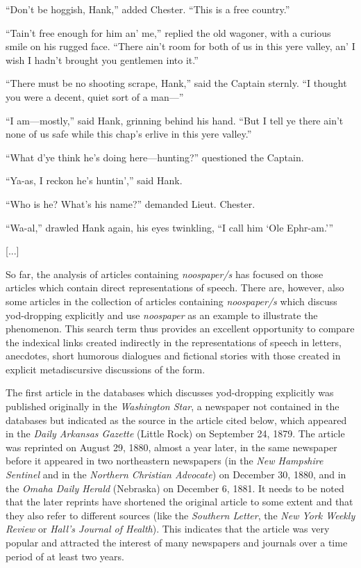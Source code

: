 \begin{ipquote}
“Don’t be hoggish, Hank,” added Chester. “This is a free country.”

“Tain’t free enough for him an’ me,” replied the old wagoner, with a curious smile on his rugged face. “There ain’t room for both of us in this yere valley, an’ I wish I hadn’t brought you gentlemen into it.”

“There must be no shooting scrape, Hank,” said the Captain sternly. “I thought you were a decent, quiet sort of a man—”

“I am—mostly,” said Hank, grinning behind his hand. “But I tell ye there ain’t none of us safe while this chap’s erlive in this yere valley.”

“What d’ye think he’s doing here—hunting?” questioned the Captain.

“Ya-as, I reckon he’s huntin’,” said Hank.

“Who is he? What’s his name?” demanded Lieut. Chester.

{“Wa-al,” drawled Hank again, his eyes twinkling, “I call him ‘Ole Ephr-am.’”

\centering
{[...]}\\
}
\end{ipquote}

So far, the analysis of articles containing \emph{noospaper/s} has focused on those articles which contain direct representations of speech. There are, however, also some articles in the collection of articles containing \emph{noospaper/s} which discuss yod-dropping explicitly and use \emph{noospaper} as an example to illustrate the phenomenon. This search term thus provides an excellent opportunity to compare the indexical links created indirectly in the representations of speech in letters, anecdotes, short humorous dialogues and fictional stories with those created in explicit metadiscursive discussions of the form.

The first article in the databases which discusses yod-dropping explicitly was published originally in the \emph{Washington Star}, a newspaper not contained in the databases but indicated as the source in the article cited below, which appeared in the \emph{Daily Arkansas Gazette} (Little Rock) on September 24, 1879. The article was reprinted on August 29, 1880, almost a year later, in the same newspaper before it appeared in two northeastern newspapers (in the \emph{New Hampshire Sentinel} and in the \emph{Northern Christian Advocate}) on December 30, 1880, and in the \emph{Omaha Daily Herald} (Nebraska) on December 6, 1881. It needs to be noted that the later reprints have shortened the original article to some extent and that they also refer to different sources (like the \emph{Southern Letter}, the \emph{New York Weekly Review} or \emph{Hall’s Journal of Health}). This indicates that the article was very popular and attracted the interest of many newspapers and journals over a time period of at least two years.

